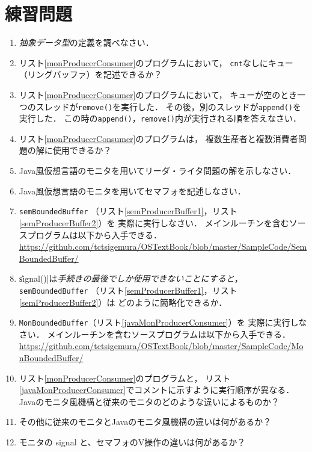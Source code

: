 \section*{練習問題}
\begin{enumerate}
  \renewcommand{\labelenumi}{\ttfamily\arabic{chapter}.\arabic{enumi}}
  \setlength{\leftskip}{1em}
\item \emph{抽象データ型}の定義を調べなさい．
\item リスト\ref{monProducerConsumer}のプログラムにおいて，
  \texttt{cnt}なしにキュー（リングバッファ）を記述できるか？
\item リスト\ref{monProducerConsumer}のプログラムにおいて，
  キューが空のとき一つのスレッドが\texttt{remove()}を実行した．
  その後，別のスレッドが\texttt{append()}を実行した．
  この時の\texttt{append()}，\texttt{remove()}内が実行される順を答えなさい．
\item リスト\ref{monProducerConsumer}のプログラムは，
  複数生産者と複数消費者問題の解に使用できるか？
\item Java風仮想言語のモニタを用いてリーダ・ライタ問題の解を示しなさい．
\item Java風仮想言語のモニタを用いてセマフォを記述しなさい．
\item \texttt{semBoundedBuffer}
  （リスト\ref{semProducerBuffer1}，リスト\ref{semProducerBuffer2}）を
  実際に実行しなさい．
  メインルーチンを含むソースプログラムは以下から入手できる． \\
  \url{https://github.com/tctsigemura/OSTextBook/blob/master/SampleCode/SemBoundedBuffer/}
\item \|signal()|は\emph{手続きの最後でしか使用できないことにすると}，
  \texttt{semBoundedBuffer}
  （リスト\ref{semProducerBuffer1}，リスト\ref{semProducerBuffer2}）は
  どのように簡略化できるか．
\item \texttt{MonBoundedBuffer}（リスト\ref{javaMonProducerConsumer}）を
  実際に実行しなさい．
  メインルーチンを含むソースプログラムは以下から入手できる．\\
  \url{https://github.com/tctsigemura/OSTextBook/blob/master/SampleCode/MonBoundedBuffer/}
\item リスト\ref{monProducerConsumer}のプログラムと，
  リスト\ref{javaMonProducerConsumer}でコメントに示すように実行順序が異なる．
  Javaのモニタ風機構と従来のモニタのどのような違いによるものか？
\item その他に従来のモニタとJavaのモニタ風機構の違いは何があるか？
\item モニタの signal と、セマフォのV操作の違いは何があるか？
\end{enumerate}
